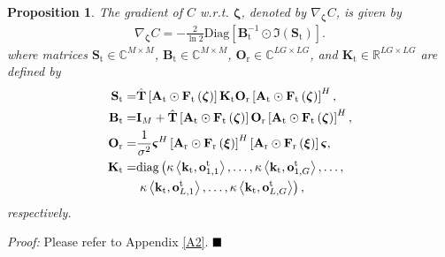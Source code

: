 \documentclass[lettersize,journal]{IEEEtran}
\newtheorem{proposition}{\textbf{Proposition}}
\begin{document}
\begin{proposition}
The gradient of $C$ \emph{w.r.t.} $\boldsymbol{\zeta}$, denoted by $\nabla_{\boldsymbol{\zeta} } C$, is given by
\begin{align}
 \nabla_{\boldsymbol{\zeta} } C = -\frac{2}{ \ln 2}\textrm{Diag}\left [ \mathbf{B}_{\textrm{t}}^{-1}\odot \Im \left ( \mathbf{S}_{\textrm{t}}\right ) \right ].\label{eq39}
\end{align}
where matrices $\mathbf{S}_{\textrm{t}}\in\mathbb{C}^{M \times M}$, $\mathbf{B}_{\textrm{t}}\in\mathbb{C}^{M \times M}$, $\mathbf{O}_{\textrm{r}}\in\mathbb{C}^{LG \times LG}$, and $\mathbf{K}_{\textrm{t}}\in\mathbb{R}^{LG \times LG}$ are defined by
\begin{align}
 \mathbf{S}_{\textrm{t}}=&\hat{\mathbf{T}}\left [ \mathbf{A}_{\textrm{t}}\odot \mathbf{F}_{\textrm{t}}\left ( \boldsymbol{\zeta} \right ) \right ]\mathbf{K}_{\textrm{t}}\mathbf{O}_{\textrm{r}}\left [ \mathbf{A}_{\textrm{t}}\odot \mathbf{F}_{\textrm{t}}\left ( \boldsymbol{\zeta} \right ) \right ]^{H}, \label{eq40}\\
 \mathbf{B}_{\textrm{t}}=&\mathbf{I}_{M}+\hat{\mathbf{T}}\left [ \mathbf{A}_{\textrm{t}}\odot \mathbf{F}_{\textrm{t}}\left ( \boldsymbol{\zeta} \right ) \right ]\mathbf{O}_{\textrm{r}}\left [ \mathbf{A}_{\textrm{t}}\odot \mathbf{F}_{\textrm{t}}\left ( \boldsymbol{\zeta} \right )\right ]^{H} ,\label{eq41}\\
 \mathbf{O}_{\textrm{r}}=&\frac{1}{\sigma ^{2}}\boldsymbol{\varsigma }^{H} \left [ \mathbf{A}_{\textrm{r}}\odot \mathbf{F}_{\textrm{r}}\left ( \boldsymbol{\xi} \right ) \right ]^{H}\left [ \mathbf{A}_{\textrm{r}}\odot \mathbf{F}_{\textrm{r}}\left ( \boldsymbol{\xi} \right ) \right ]\boldsymbol{\varsigma },\\
 \mathbf{K}_{\textrm{t}}=&\textrm{diag}\left ( \kappa \left \langle \mathbf{k}_{\textrm{t}},\mathbf{o}_{1,1}^{\textrm{t}} \right \rangle ,\ldots,\kappa \left \langle \mathbf{k}_{\textrm{t}},\mathbf{o}_{1,G}^{\textrm{t}} \right \rangle ,\ldots ,\right . \notag\\
 &\left. \kappa \left \langle \mathbf{k}_{\textrm{t}},\mathbf{o}_{L,1}^{\textrm{t}} \right \rangle ,\ldots, \kappa \left \langle \mathbf{k}_{\textrm{t}},\mathbf{o}_{L,G}^{\textrm{t}} \right \rangle \right ),
\end{align}
respectively.
\end{proposition}


\emph{Proof:} Please refer to Appendix \ref{A2}. $\hfill\blacksquare$
\end{document}
